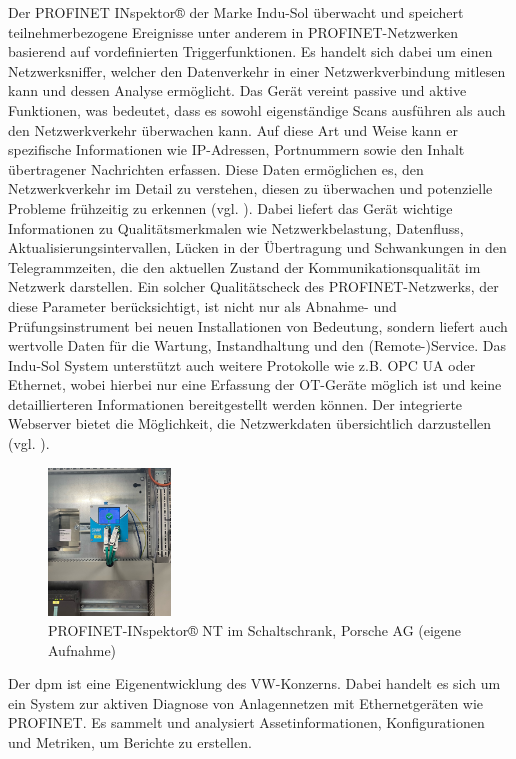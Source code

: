  Der PROFINET INspektor® der Marke Indu-Sol überwacht und speichert teilnehmerbezogene Ereignisse unter anderem in PROFINET-Netzwerken basierend auf vordefinierten Triggerfunktionen. Es handelt sich dabei um einen Netzwerksniffer, welcher den Datenverkehr in einer Netzwerkverbindung mitlesen kann und dessen Analyse ermöglicht. Das Gerät vereint passive und aktive Funktionen, was bedeutet, dass es sowohl eigenständige Scans ausführen als auch den Netzwerkverkehr überwachen kann. Auf diese Art und Weise kann er spezifische Informationen wie IP-Adressen, Portnummern sowie den Inhalt übertragener Nachrichten erfassen. Diese Daten ermöglichen es, den Netzwerkverkehr im Detail zu verstehen, diesen zu überwachen und potenzielle Probleme frühzeitig zu erkennen (vgl. \cite{luber}). Dabei liefert das Gerät wichtige Informationen zu Qualitätsmerkmalen wie Netzwerkbelastung, Datenfluss, Aktualisierungsintervallen, Lücken in der Übertragung und Schwankungen in den Telegrammzeiten, die den aktuellen Zustand der Kommunikationsqualität im Netzwerk darstellen. Ein solcher Qualitätscheck des PROFINET-Netzwerks, der diese Parameter berücksichtigt, ist nicht nur als Abnahme- und Prüfungsinstrument bei neuen Installationen von Bedeutung, sondern liefert auch wertvolle Daten für die Wartung, Instandhaltung und den (Remote-)Service. Das Indu-Sol System unterstützt auch weitere Protokolle wie z.B. OPC UA oder Ethernet, wobei hierbei nur eine Erfassung der OT-Geräte möglich ist und keine detaillierteren Informationen bereitgestellt werden können. Der integrierte Webserver bietet die Möglichkeit, die Netzwerkdaten übersichtlich darzustellen (vgl. \cite{InduSol}).
\begin{figure}[H]
    \centering
    \includegraphics[width=0.29\textwidth]{images/PROFINET-INspektor.jpg}
    \caption{PROFINET-INspektor® NT im Schaltschrank, Porsche AG (eigene Aufnahme)}
    \label{fig:PROFINET-INspektor® NT}
\end{figure} 
\noindent Der \ac{dpm} ist eine Eigenentwicklung des VW-Konzerns. Dabei handelt es sich um ein System zur aktiven Diagnose von Anlagennetzen mit Ethernetgeräten wie PROFINET. Es sammelt und analysiert Assetinformationen, Konfigurationen und Metriken, um Berichte zu erstellen. 
